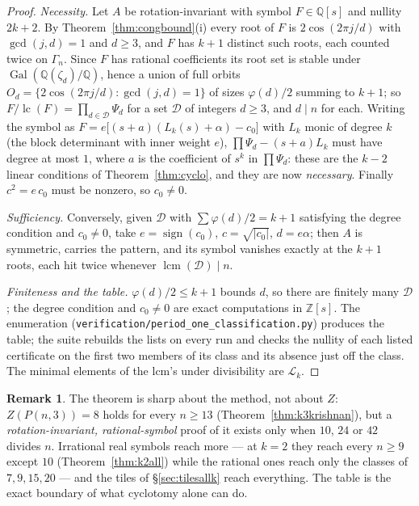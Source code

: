 \documentclass[11pt]{article}
\theoremstyle{definition}
\newtheorem{remark}[theorem]{Remark}
\begin{document}
\begin{proof}
\emph{Necessity.} Let $A$ be rotation-invariant with symbol $F\in\mathbb Q[s]$
and nullity $2k+2$. By Theorem~\ref{thm:congbound}(i) every root of $F$ is
$2\cos(2\pi j/d)$ with $\gcd(j,d)=1$ and $d\ge3$, and $F$ has $k+1$ distinct
such roots, each counted twice on $\Gamma_n$. Since $F$ has rational
coefficients its root set is stable under $\operatorname{Gal}(\mathbb Q(\zeta_d)/\mathbb Q)$,
hence a union of full orbits $O_d=\{2\cos(2\pi j/d):\gcd(j,d)=1\}$ of sizes
$\varphi(d)/2$ summing to $k+1$; so $F/\operatorname{lc}(F)=\prod_{d\in\mathcal D}\Psi_d$
for a set $\mathcal D$ of integers $d\ge3$, and $d\mid n$ for each. Writing the
symbol as $F=e\bigl[(s+a)(L_k(s)+\alpha)-c_0\bigr]$ with $L_k$ monic of degree
$k$ (the block determinant with inner weight $e$), $\prod\Psi_d-(s+a)L_k$ must
have degree at most $1$, where $a$ is the coefficient of $s^k$ in
$\prod\Psi_d$: these are the $k-2$ linear conditions of
Theorem~\ref{thm:cyclo}, and they are now \emph{necessary}. Finally
$c^2=e\,c_0$ must be nonzero, so $c_0\ne0$.

\emph{Sufficiency.} Conversely, given $\mathcal D$ with $\sum\varphi(d)/2=k+1$
satisfying the degree condition and $c_0\ne0$, take $e=\operatorname{sign}(c_0)$,
$c=\sqrt{|c_0|}$, $d=e\alpha$; then $A$ is symmetric, carries the pattern, and
its symbol vanishes exactly at the $k+1$ roots, each hit twice whenever
$\operatorname{lcm}(\mathcal D)\mid n$.

\emph{Finiteness and the table.} $\varphi(d)/2\le k+1$ bounds $d$, so there are
finitely many $\mathcal D$; the degree condition and $c_0\ne0$ are exact
computations in $\mathbb Z[s]$. The enumeration
(\texttt{verification/period\_one\_classification.py}) produces the table; the
suite rebuilds the lists on every run and checks the nullity of each listed
certificate on the first two members of its class and its absence just off the
class. The minimal elements of the lcm's under divisibility are $\mathcal L_k$.
\end{proof}

\begin{remark}
The theorem is sharp about the method, not about $Z$: $Z(P(n,3))=8$ holds for
every $n\ge13$ (Theorem~\ref{thm:k3krishnan}), but a \emph{rotation-invariant,
rational-symbol} proof of it exists only when $10$, $24$ or $42$ divides $n$.
Irrational real symbols reach more --- at $k=2$ they reach every $n\ge9$ except
$10$ (Theorem~\ref{thm:k2all}) while the rational ones reach only the classes
of $7,9,15,20$ --- and the tiles of \S\ref{sec:tilesallk} reach everything. The
table is the exact boundary of what cyclotomy alone can do.
\end{remark}
\end{document}
